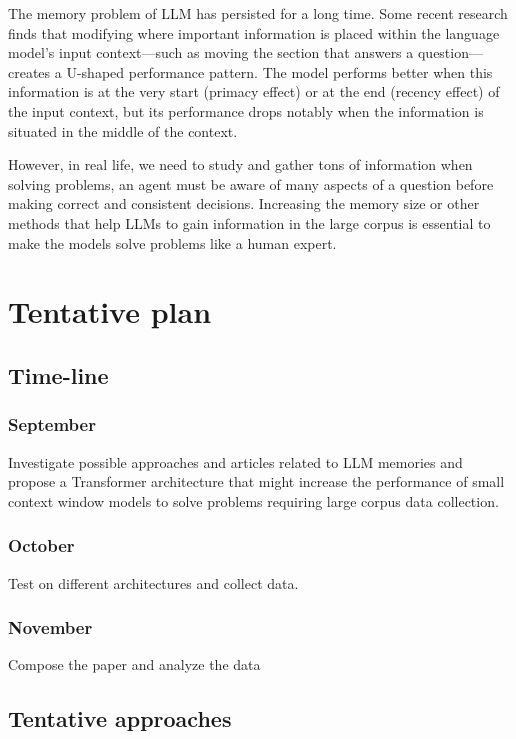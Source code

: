 \documentclass{article}
\begin{document}
The memory problem of LLM has persisted for a long time. Some recent research finds that modifying where important information is placed within the language model’s input context—such as moving the section that answers a question—creates a U-shaped performance pattern. The model performs better when this information is at the very start (primacy effect) or at the end (recency effect) of the input context, but its performance drops notably when the information is situated in the middle of the context. \cite{liu2023lostmiddlelanguagemodels}

However, in real life, we need to study and gather tons of information when solving problems, an agent must be aware of many aspects of a question before making correct and consistent decisions. Increasing the memory size or other methods that help LLMs to gain information in the large corpus is essential to make the models solve problems like a human expert.

\section{Tentative plan}
\label{tentative plan}


\subsection{Time-line}
\subsubsection{September}

Investigate possible approaches and articles related to LLM memories and propose a Transformer architecture that might increase the performance of small context window models to solve problems requiring large corpus data collection. 

\subsubsection{October}

Test on different architectures and collect data.

\subsubsection{November}

Compose the paper and analyze the data

\subsection{Tentative approaches}
\end{document}
